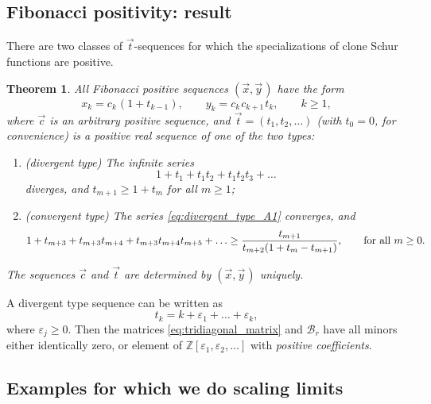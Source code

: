 \documentclass[letterpaper,11pt,oneside,reqno]{article}
\numberwithin{equation}{section}
\newcommand{\ssp}{\hspace{1pt}}
\newtheorem{theorem}[proposition]{Theorem}
\theoremstyle{definition}
\begin{document}
\subsection{Fibonacci positivity: result}

There are two classes of $\vec t$-sequences for which the
specializations of clone Schur functions are positive.
\begin{theorem}
	All Fibonacci positive sequences
	$(\vec x,\vec{y}\ssp)$
	have the form
	\begin{equation*}
		x_k=c_k\ssp (1+t_{k-1}),\qquad y_k=c_k\ssp c_{k+1}\ssp t_k, \qquad k\ge1,
	\end{equation*}
	where $\vec c$ is an
	arbitrary positive sequence,
	and $\vec t=(t_1,t_2,\ldots )$ (with $t_0=0$, for convenience) is
	a positive real sequence of one of the two types:
	\begin{enumerate}[$\bullet$]
		\item (divergent type)
			The infinite series
			\begin{equation}
				\label{eq:divergent_type_A1}
				1+t_1+t_1t_2+t_1t_2t_3+\ldots
			\end{equation}
			diverges, and
			$t_{m+1}\ge 1+t_m$ for all $m\ge 1$;
		\item (convergent type)
			The series \eqref{eq:divergent_type_A1} converges, and
			\begin{equation*}
				 1+t_{m+3}+t_{m+3}t_{m+4}+
				t_{m+3}t_{m+4}t_{m+5}+\ldots
				\ge
				\frac{t_{m+1}}{t_{m+2}(1+t_m-t_{m+1})}
				,
				\qquad
				\textnormal{for all }
				m\ge0.
			\end{equation*}
	\end{enumerate}
	The sequences $\vec c$ and $\vec t$ are determined by $(\vec x,\vec{y}\ssp)$ uniquely.
\end{theorem}

A divergent type sequence can be written
as 
\begin{equation*}
	t_k=k+\varepsilon_1+\ldots+\varepsilon_k ,
\end{equation*}
where $\varepsilon_j\ge 0$. Then the matrices
\eqref{eq:tridiagonal_matrix} and $\mathcal{B}_r$ 
have all minors either identically zero, 
or element of $\mathbb{Z}[\varepsilon_1,\varepsilon_2,\ldots ]$
with \emph{positive coefficients}.

\subsection{Examples for which we do scaling limits}
\end{document}
